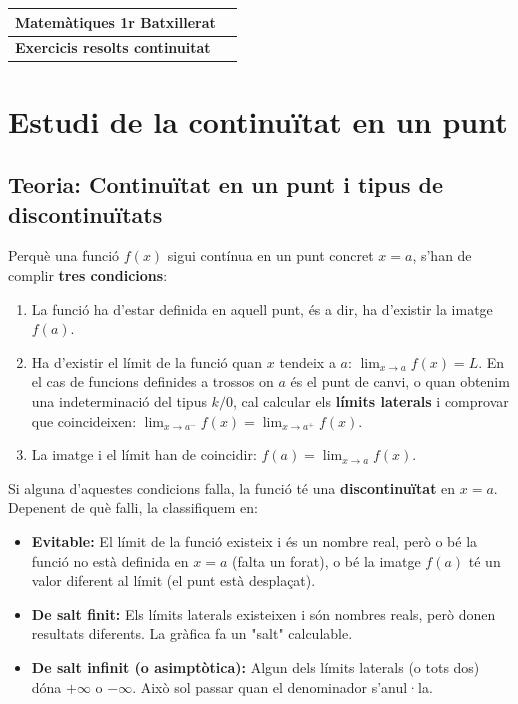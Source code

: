 \documentclass[12pt,a4paper]{article}
\begin{document}
\begingroup
\renewcommand{\arraystretch}{2.2}
\begin{tabularx}{\textwidth}{|X|p{4cm}|}
\hline
\textbf{Matemàtiques 1r Batxillerat}  \\ \hline
\textbf{Exercicis resolts continuitat} \\ \hline
\end{tabularx}
\endgroup

\vspace{0.5cm}

\renewcommand{\contentsname}{Índex}
\tableofcontents
\vspace{1cm}

\section{Estudi de la continuïtat en un punt}

\subsection{Teoria: Continuïtat en un punt i tipus de discontinuïtats}

Perquè una funció $f(x)$ sigui contínua en un punt concret $x=a$, s'han de complir \textbf{tres condicions}:
\begin{enumerate}
    \item La funció ha d'estar definida en aquell punt, és a dir, ha d'existir la imatge $f(a)$.
    \item Ha d'existir el límit de la funció quan $x$ tendeix a $a$: $\lim_{x \to a} f(x) = L$. En el cas de funcions definides a trossos on $a$ és el punt de canvi, o quan obtenim una indeterminació del tipus $k/0$, cal calcular els \textbf{límits laterals} i comprovar que coincideixen: $\lim_{x \to a^-} f(x) = \lim_{x \to a^+} f(x)$.
    \item La imatge i el límit han de coincidir: $f(a) = \lim_{x \to a} f(x)$.
\end{enumerate}

Si alguna d'aquestes condicions falla, la funció té una \textbf{discontinuïtat} en $x=a$. Depenent de què falli, la classifiquem en:
\begin{itemize}
    \item \textbf{Evitable:} El límit de la funció existeix i és un nombre real, però o bé la funció no està definida en $x=a$ (falta un forat), o bé la imatge $f(a)$ té un valor diferent al límit (el punt està desplaçat).
    \item \textbf{De salt finit:} Els límits laterals existeixen i són nombres reals, però donen resultats diferents. La gràfica fa un "salt" calculable.
    \item \textbf{De salt infinit (o asimptòtica):} Algun dels límits laterals (o tots dos) dóna $+\infty$ o $-\infty$. Això sol passar quan el denominador s'anul·la.
\end{itemize}
\end{document}
